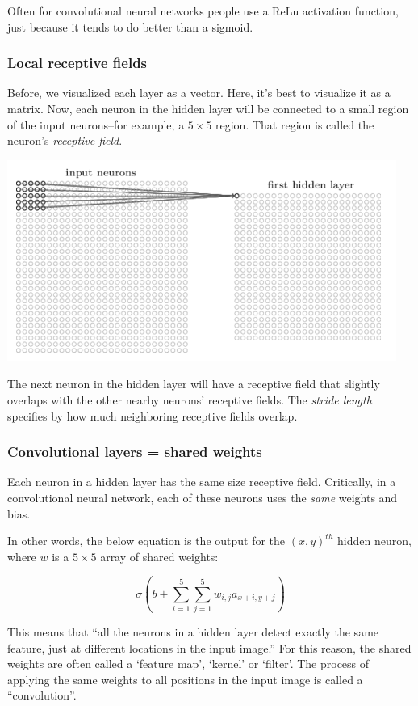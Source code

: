 \documentclass[12pt]{article}
\begin{document}
Often for convolutional neural networks people use a ReLu activation function, just because it tends to do better than a sigmoid.

\subsubsection*{Local receptive fields}

Before, we visualized each layer as a vector. Here, it's best to visualize it as a matrix. Now, each neuron in the hidden layer will be connected to a small region of the input neurons--for example, a $5 \times 5$ region. That region is called the neuron's \textit{receptive field}.

\includegraphics[scale=0.8]{receptive-field.png}

The next neuron in the hidden layer will have a receptive field that slightly overlaps with the other nearby neurons' receptive fields. The \textit{stride length} specifies by how much neighboring receptive fields overlap.


\subsubsection*{Convolutional layers = shared weights}

Each neuron in a hidden layer has the same size receptive field. Critically, in a convolutional neural network, each of these neurons uses the \textit{same} weights and bias.

In other words, the below equation is the output for the $(x,y)^{th}$ hidden neuron, where $w$ is a $5 \times 5$ array of shared weights:

$$ \sigma\left( b + \sum_{i=1}^5 \sum_{j=1}^5 w_{i,j}a_{x+i,y+j} \right) $$

This means that ``all the neurons in a hidden layer detect exactly the same feature, just at different locations in the input image.'' For this reason, the shared weights are often called a `feature map', `kernel' or `filter'. The process of applying the same weights to all positions in the input image is called a ``convolution''.
\end{document}
